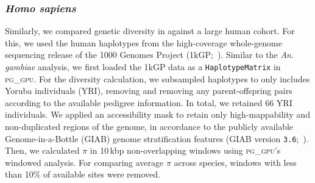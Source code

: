 \subsubsection*{\textit{Homo sapiens}}

Similarly, we compared genetic diversity in \bgla{} against a large human cohort.
For this, we used the human haplotypes from the high-coverage whole-genome sequencing
release of the 1000 Genomes Project (1kGP;~\citealp{hg1kg_nygc}).
Similar to the \textit{An. gambiae} analysis, we first loaded the 1kGP data as a
\texttt{HaplotypeMatrix} in \textsc{pg\_gpu}.
For the diversity calculation, we subsampled haplotypes to only includes Yoruba individuals (YRI),
removing and removing any parent-offspring pairs according to the available pedigree information.
In total, we retained 66 YRI individuals.
We applied an accessibility mask to retain only high-mappability and non-duplicated regions of the
genome, in accordance to the publicly available Genome-in-a-Bottle (GIAB) genome stratification
features (GIAB version \texttt{3.6};~\citealp{dwarshuis_giab_2024}).
Then, we calculated $\pi$ in 10\,kbp non-overlapping windows using \textsc{pg\_gpu}'s windowed
analysis.
For comparing average $\pi$ across species, windows with less than 10\% of available sites were removed.
